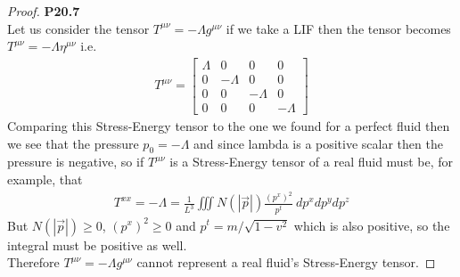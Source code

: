\documentclass[11pt]{article}
\theoremstyle{definition}
\begin{document}
\cleardoublepage
\begin{proof}{\textbf{P20.7}}\\
Let us consider the tensor $T^{\mu\nu} = - \Lambda g^{\mu\nu}$ if we take a LIF
then the tensor becomes $T^{\mu\nu} = - \Lambda \eta^{\mu\nu}$ i.e.
\begin{align*}
    T^{\mu\nu} = \begin{bmatrix}
        \Lambda & 0 & 0 & 0\\
        0 & -\Lambda & 0 & 0\\
        0 & 0 & -\Lambda & 0\\
        0 & 0 & 0 & -\Lambda
    \end{bmatrix}
\end{align*}
Comparing this Stress-Energy tensor to the one we found for a perfect fluid
then we see that the pressure $p_0 = -\Lambda$ and since lambda is a positive
scalar then the pressure is negative, so if $T^{\mu\nu}$ is a Stress-Energy 
tensor of a real fluid must be, for example, that
\begin{align*}
    T^{xx} = -\Lambda
    = \frac{1}{L^3}\iiint N(|\vec{p}|)\frac{(p^x)^2}{p^t}~dp^x dp^y dp^z
\end{align*}
But $N(|\vec{p}|) \geq 0$, $(p^x)^2 \geq 0$ and $p^t = m/\sqrt{1 - v^2}$ which
is also positive, so the integral must be positive as well.\\
Therefore $T^{\mu\nu} = - \Lambda g^{\mu\nu}$ cannot represent a real fluid's 
Stress-Energy tensor.
\end{proof}
\end{document}
